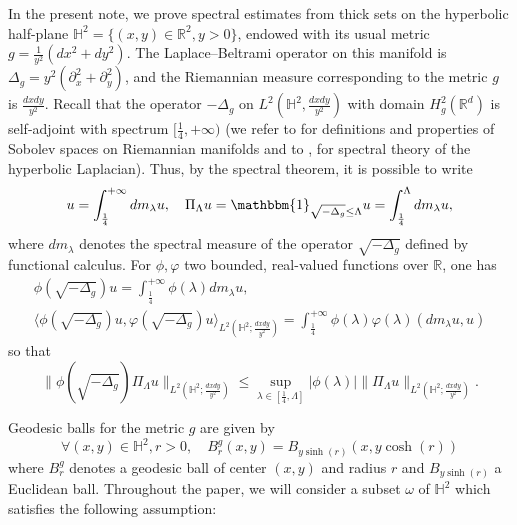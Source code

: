 \documentclass[letterpaper,11pt]{amsart}
\theoremstyle{note}
\numberwithin{equation}{section}
\begin{document}
In the present note, we prove spectral estimates from thick sets on the hyperbolic half-plane $\mathbb{H}^2 = \{(x,y) \in \mathbb{R}^2, y > 0\}$, endowed with its usual metric $g = \frac{1}{y^2}(dx^2 + dy^2)$. The Laplace--Beltrami operator on this manifold is $\Delta_g = y^2 \left(\partial_x^2 + \partial_y^2\right)$, and the Riemannian measure corresponding to the metric $g$ is $\frac{dxdy}{y^2}$. Recall that the operator $-\Delta_g$ on $L^2(\mathbb{H}^2, \frac{dxdy}{y^2})$ with domain $H^2_g(\mathbb{R}^d)$ is self-adjoint with spectrum $[\frac{1}{4},+\infty)$ (we refer to \cite{hebey1996sobolev,grigor'yan2009book} for definitions and properties of Sobolev spaces on Riemannian manifolds and to \cite{bergeron2011livre}, \cite[Chapter 4]{borthwick2016book} for spectral theory of the hyperbolic Laplacian).
Thus, by the spectral theorem, it is possible to write $$u = \int_\frac{1}{4}^{+\infty} dm_\lambda u, \quad \Pi_\Lambda u = \mathbbm{1}_{\sqrt{-\Delta_g} \leq \Lambda} u =\int_\frac{1}{4}^\Lambda dm_\lambda u,$$ where $dm_\lambda$ denotes the spectral measure of the operator $\sqrt{-\Delta_g}$ defined by functional calculus. For $\phi, \varphi$ two bounded, real-valued functions over $\mathbb{R}$, one has \begin{multline*}\phi(\sqrt{-\Delta_g})u = \int_\frac{1}{4}^{+\infty}\phi(\lambda)dm_\lambda u, \\ \langle \phi(\sqrt{-\Delta_g})u, \varphi(\sqrt{-\Delta_g})u \rangle_{L^2\left(\mathbb{H}^2;\frac{dxdy}{y^2}\right)} = \int_\frac{1}{4}^{+\infty} \phi(\lambda) \varphi(\lambda) (dm_\lambda u, u)\end{multline*} so that \begin{equation}
    \label{eq: functional calculus bound}
    \|\phi(\sqrt{-\Delta_g})\Pi_\Lambda u\|_{L^2\left(\mathbb{H}^2; \frac{dxdy}{y^2}\right)} \leq \sup_{\lambda \in [\frac{1}{4},\Lambda]} |\phi(\lambda)| \|\Pi_\Lambda u\|_{L^2\left(\mathbb{H}^2;\frac{dxdy}{y^2}\right)}.
\end{equation}

Geodesic balls for the metric $g$ are given by \begin{equation}
    \label{eq: geodesic balls}
    \forall (x,y) \in \mathbb{H}^2, r > 0, \quad B^g_r(x,y) = B_{y\sinh(r)}(x,y\cosh(r)) 
\end{equation} where $B_r^g$ denotes a geodesic ball of center $(x,y)$ and radius $r$ and $B_{y\sinh(r)}$ a Euclidean ball. Throughout the paper, we will consider a subset $\omega$ of $\mathbb{H}^2$ which satisfies the following assumption:
\end{document}
